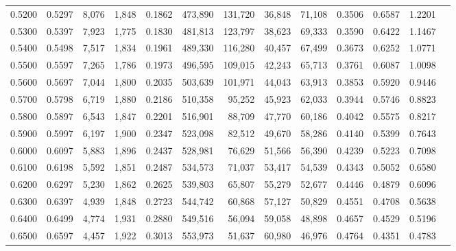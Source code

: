 \begin{tabular}{rrrrrrrrrrrrr}
0.5200 & 0.5297 &  8,076 & 1,848 &                                     0.1862 & 473,890 & 131,720 &  36,848 &  71,108 & 0.3506 & 0.6587 & 1.2201 \\
0.5300 & 0.5397 &  7,923 & 1,775 &                                     0.1830 & 481,813 & 123,797 &  38,623 &  69,333 & 0.3590 & 0.6422 & 1.1467 \\
0.5400 & 0.5498 &  7,517 & 1,834 &                                     0.1961 & 489,330 & 116,280 &  40,457 &  67,499 & 0.3673 & 0.6252 & 1.0771 \\
0.5500 & 0.5597 &  7,265 & 1,786 &                                     0.1973 & 496,595 & 109,015 &  42,243 &  65,713 & 0.3761 & 0.6087 & 1.0098 \\
0.5600 & 0.5697 &  7,044 & 1,800 &                                     0.2035 & 503,639 & 101,971 &  44,043 &  63,913 & 0.3853 & 0.5920 & 0.9446 \\
0.5700 & 0.5798 &  6,719 & 1,880 &                                     0.2186 & 510,358 &  95,252 &  45,923 &  62,033 & 0.3944 & 0.5746 & 0.8823 \\
0.5800 & 0.5897 &  6,543 & 1,847 &                                     0.2201 & 516,901 &  88,709 &  47,770 &  60,186 & 0.4042 & 0.5575 & 0.8217 \\
0.5900 & 0.5997 &  6,197 & 1,900 &                                     0.2347 & 523,098 &  82,512 &  49,670 &  58,286 & 0.4140 & 0.5399 & 0.7643 \\
0.6000 & 0.6097 &  5,883 & 1,896 &                                     0.2437 & 528,981 &  76,629 &  51,566 &  56,390 & 0.4239 & 0.5223 & 0.7098 \\
0.6100 & 0.6198 &  5,592 & 1,851 &                                     0.2487 & 534,573 &  71,037 &  53,417 &  54,539 & 0.4343 & 0.5052 & 0.6580 \\
0.6200 & 0.6297 &  5,230 & 1,862 &                                     0.2625 & 539,803 &  65,807 &  55,279 &  52,677 & 0.4446 & 0.4879 & 0.6096 \\
0.6300 & 0.6397 &  4,939 & 1,848 &                                     0.2723 & 544,742 &  60,868 &  57,127 &  50,829 & 0.4551 & 0.4708 & 0.5638 \\
0.6400 & 0.6499 &  4,774 & 1,931 &                                     0.2880 & 549,516 &  56,094 &  59,058 &  48,898 & 0.4657 & 0.4529 & 0.5196 \\
0.6500 & 0.6597 &  4,457 & 1,922 &                                     0.3013 & 553,973 &  51,637 &  60,980 &  46,976 & 0.4764 & 0.4351 & 0.4783 \\

\end{tabular}

